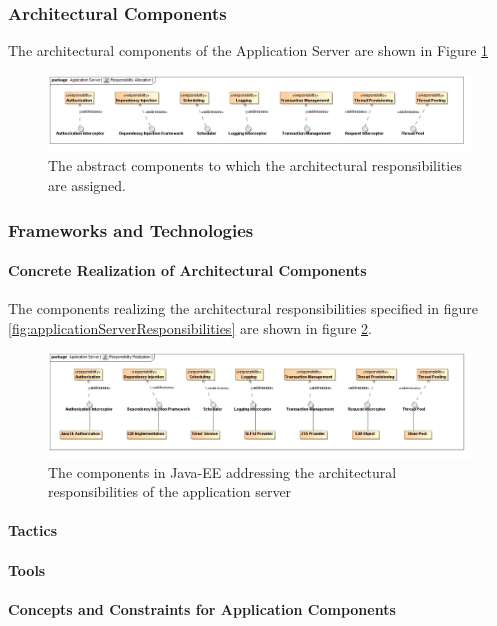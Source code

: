 \subsubsection{Architectural Components}
The architectural components of the Application Server are shown in Figure \ref{fig:applicationServerResponsibilityAllocation}
\begin{figure}[H]
	\begin{center}
	\includegraphics[scale=0.4]{../Diagrams and Charts/Application Server/ResponsibilityAllocation.jpg}
	\caption{The abstract components to which the architectural responsibilities are assigned.}
	\label{fig:applicationServerResponsibilityAllocation}
	\end{center}
\end{figure}

\subsubsection{Frameworks and Technologies}
\paragraph{Concrete Realization of Architectural Components}
The components realizing the architectural responsibilities specified in figure \ref{fig:applicationServerResponsibilities} are shown in figure \ref{fig:applicationServerResponsibilityRealization}.
\begin{figure}[H]
	\begin{center}
	\includegraphics[scale=0.4]{../Diagrams and Charts/Application Server/ResponsibilityRealization.jpg}
	\caption{The components in Java-EE addressing the architectural responsibilities of the application server}
	\label{fig:applicationServerResponsibilityRealization}
	\end{center}
\end{figure}

\paragraph{Tactics}
\paragraph{Tools}
\paragraph{Concepts and Constraints for Application Components}
